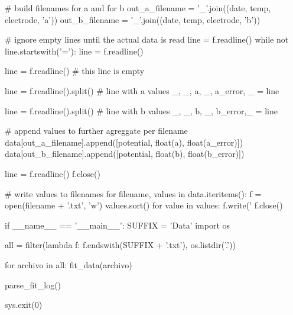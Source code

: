 \documentclass[a4paper]{article}
\begin{document}
\begin{python}
            # build filenames for a and for b
            out_a_filename = '_'.join((date, temp, electrode, 'a'))
            out_b_filename = '_'.join((date, temp, electrode, 'b'))

            # ignore empty lines until the actual data is read
            line = f.readline()
            while not line.startswith('='):
                line = f.readline()

            line = f.readline() # this line is empty

            line = f.readline().split() # line with a values
            _, _, a, _, a_error, _ = line

            line = f.readline().split() # line with b values
            _, _, b, _, b_error,_ = line

            # append values to further agreggate per filename
            data[out_a_filename].append([potential, float(a), float(a_error)])
            data[out_b_filename].append([potential, float(b), float(b_error)])

        line = f.readline()
    f.close()

    # write values to filenames
    for filename, values in data.iteritems():
        f = open(filename + '.txt', 'w')
        values.sort()
        for value in values:
            f.write('%
        f.close()

if __name__ == '__main__':
    SUFFIX = 'Data'
    import os

    all = filter(lambda f: f.endswith(SUFFIX + '.txt'), os.listdir('.'))

    for archivo in all:
        fit_data(archivo)

    parse_fit_log()

    sys.exit(0)
\end{python}
\end{document}

